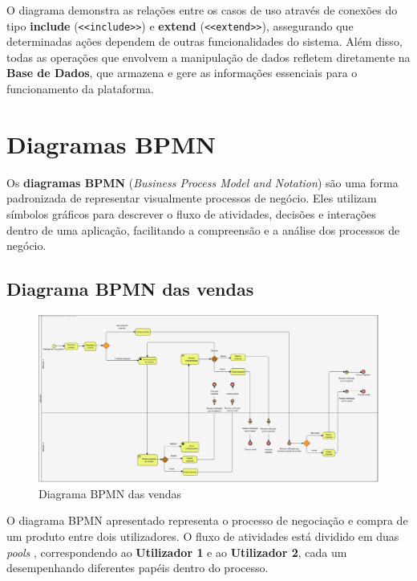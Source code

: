 \documentclass[a4paper, 12pt]{article} %
\begin{document}
O diagrama demonstra as relações entre os casos de uso através de conexões do tipo \textbf{include} (\texttt{<<include>>}) e \textbf{extend} (\texttt{<<extend>>}), assegurando que determinadas ações dependem de outras funcionalidades do sistema. Além disso, todas as operações que envolvem a manipulação de dados refletem diretamente na \textbf{Base de Dados}, que armazena e gere as informações essenciais para o funcionamento da plataforma.
\newpage
\section{Diagramas BPMN}

Os \textbf{diagramas BPMN} (\textit{Business Process Model and Notation}) são uma forma padronizada de representar visualmente processos de negócio. Eles utilizam símbolos gráficos para descrever o fluxo de atividades, decisões e interações dentro de uma aplicação, facilitando a compreensão e a análise dos processos de negócio.

\subsection{Diagrama BPMN das vendas}

\begin{figure}[ht]
	\centering
	\includegraphics[width=\textwidth]{../images/bpmn-sales.png}
	\caption{Diagrama BPMN das vendas}
	\label{fig:bpmn vendas}
\end{figure}


O diagrama BPMN apresentado representa o processo de negociação e compra de um produto entre dois utilizadores. O fluxo de atividades está dividido em duas \textit{pools} , correspondendo ao \textbf{Utilizador 1} e ao \textbf{Utilizador 2}, cada um desempenhando diferentes papéis dentro do processo.
\end{document}

